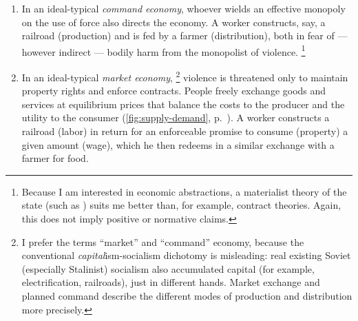 \begin{enumerate}
	\item In an ideal-typical \cite{Weber-1920-aa} \emph{command economy}, whoever wields an effective monopoly on the use of force also directs the economy.
	A worker constructs, say, a railroad (production) and is fed by a farmer (distribution), both in fear of --- however indirect --- bodily harm from the monopolist of violence.
	\footnote{
		Because I am  interested in economic abstractions, a materialist theory of the state (such as \citealt{Tilly-1985-aa}) suits me better than, for example, contract theories.
		Again, this does not imply positive or normative claims.
	}

	\item In an ideal-typical \emph{market economy},
	\footnote{
		I prefer the terms ``market'' and ``command'' economy, because the conventional \emph{capital}ism-socialism dichotomy is misleading:
		real existing Soviet (especially Stalinist) socialism also accumulated capital (for example, electrification, railroads), just in different hands.
		Market exchange and planned command describe the different modes of production and distribution more precisely.
	}
	violence is threatened only to maintain property rights and enforce contracts.
	People freely exchange goods and services at equilibrium prices that balance the costs to the producer and the utility to the consumer (\autoref{fig:supply-demand}, p.~\pageref{fig:supply-demand}).
	A worker constructs a railroad (labor) in return for an enforceable promise to consume (property) a given amount (wage), which he then redeems in a similar exchange with a farmer for food.
\end{enumerate}


